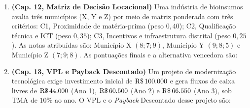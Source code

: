 \begin{enumerate}[leftmargin=1.5em, itemsep=5pt, resume]
  \item \textbf{(Cap. 12, Matriz de Decisão Locacional)} Uma indústria de bioinsumos avalia três municípios (X, Y e Z) por meio de matriz ponderada com três critérios: C1, Proximidade de matéria-prima (peso $0{,}40$); C2, Qualificação técnica e ICT (peso $0{,}35$); C3, Incentivos e infraestrutura distrital (peso $0{,}25$). As notas atribuídas são: Município X $(8; 7; 9)$, Município Y $(9; 8; 5)$ e Município Z $(7; 9; 8)$. As pontuações finais e a alternativa vencedora são:

  \item \textbf{(Cap. 13, VPL e Payback Descontado)} Um projeto de modernização tecnológica exige investimento inicial de $\text{R\$\,}{100.000}$ e gera fluxos de caixa livres de $\text{R\$\,}{44.000}$ (Ano 1), $\text{R\$\,}{60.500}$ (Ano 2) e $\text{R\$\,}{66.550}$ (Ano 3), sob $\text{TMA}$ de $10\%$ ao ano. O $\text{VPL}$ e o \textit{Payback} Descontado desse projeto são:


\end{enumerate}
